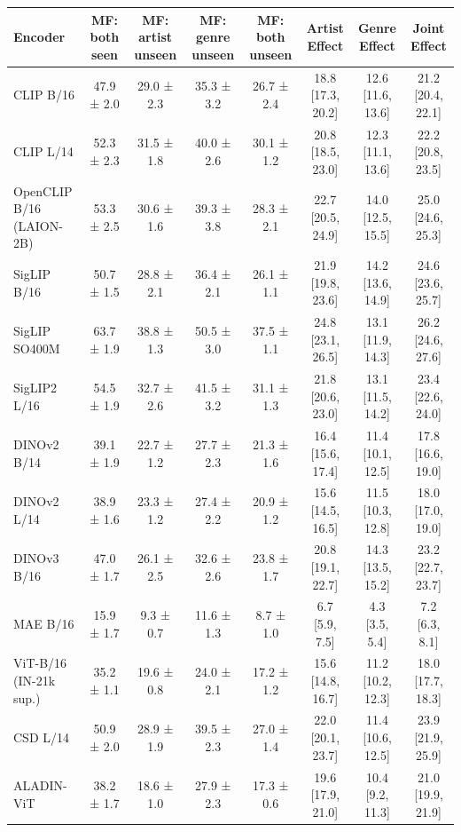 \begin{tabular}{lccccccc}
\toprule
Encoder & MF: both seen & MF: artist unseen & MF: genre unseen & MF: both unseen & Artist Effect & Genre Effect & Joint Effect \\
\midrule
CLIP B/16 & 47.9 ± 2.0 & 29.0 ± 2.3 & 35.3 ± 3.2 & 26.7 ± 2.4 & 18.8 [17.3, 20.2] & 12.6 [11.6, 13.6] & 21.2 [20.4, 22.1] \\
CLIP L/14 & 52.3 ± 2.3 & 31.5 ± 1.8 & 40.0 ± 2.6 & 30.1 ± 1.2 & 20.8 [18.5, 23.0] & 12.3 [11.1, 13.6] & 22.2 [20.8, 23.5] \\
OpenCLIP B/16 (LAION-2B) & 53.3 ± 2.5 & 30.6 ± 1.6 & 39.3 ± 3.8 & 28.3 ± 2.1 & 22.7 [20.5, 24.9] & 14.0 [12.5, 15.5] & 25.0 [24.6, 25.3] \\
SigLIP B/16 & 50.7 ± 1.5 & 28.8 ± 2.1 & 36.4 ± 2.1 & 26.1 ± 1.1 & 21.9 [19.8, 23.6] & 14.2 [13.6, 14.9] & 24.6 [23.6, 25.7] \\
SigLIP SO400M & 63.7 ± 1.9 & 38.8 ± 1.3 & 50.5 ± 3.0 & 37.5 ± 1.1 & 24.8 [23.1, 26.5] & 13.1 [11.9, 14.3] & 26.2 [24.6, 27.6] \\
SigLIP2 L/16 & 54.5 ± 1.9 & 32.7 ± 2.6 & 41.5 ± 3.2 & 31.1 ± 1.3 & 21.8 [20.6, 23.0] & 13.1 [11.5, 14.2] & 23.4 [22.6, 24.0] \\
DINOv2 B/14 & 39.1 ± 1.9 & 22.7 ± 1.2 & 27.7 ± 2.3 & 21.3 ± 1.6 & 16.4 [15.6, 17.4] & 11.4 [10.1, 12.5] & 17.8 [16.6, 19.0] \\
DINOv2 L/14 & 38.9 ± 1.6 & 23.3 ± 1.2 & 27.4 ± 2.2 & 20.9 ± 1.2 & 15.6 [14.5, 16.5] & 11.5 [10.3, 12.8] & 18.0 [17.0, 19.0] \\
DINOv3 B/16 & 47.0 ± 1.7 & 26.1 ± 2.5 & 32.6 ± 2.6 & 23.8 ± 1.7 & 20.8 [19.1, 22.7] & 14.3 [13.5, 15.2] & 23.2 [22.7, 23.7] \\
MAE B/16 & 15.9 ± 1.7 & 9.3 ± 0.7 & 11.6 ± 1.3 & 8.7 ± 1.0 & 6.7 [5.9, 7.5] & 4.3 [3.5, 5.4] & 7.2 [6.3, 8.1] \\
ViT-B/16 (IN-21k sup.) & 35.2 ± 1.1 & 19.6 ± 0.8 & 24.0 ± 2.1 & 17.2 ± 1.2 & 15.6 [14.8, 16.7] & 11.2 [10.2, 12.3] & 18.0 [17.7, 18.3] \\
CSD L/14 & 50.9 ± 2.0 & 28.9 ± 1.9 & 39.5 ± 2.3 & 27.0 ± 1.4 & 22.0 [20.1, 23.7] & 11.4 [10.6, 12.5] & 23.9 [21.9, 25.9] \\
ALADIN-ViT & 38.2 ± 1.7 & 18.6 ± 1.0 & 27.9 ± 2.3 & 17.3 ± 0.6 & 19.6 [17.9, 21.0] & 10.4 [9.2, 11.3] & 21.0 [19.9, 21.9] \\
\bottomrule
\end{tabular}
